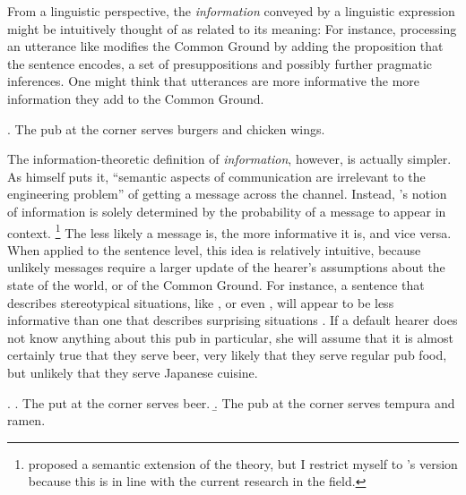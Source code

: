 From a linguistic perspective, the \textit{information} conveyed by a linguistic expression might be intuitively thought of as related to its meaning: For instance, processing an utterance like \Next modifies the Common Ground \citep{stalnaker2002} by adding the proposition that the sentence encodes, a set of presuppositions and possibly further pragmatic inferences. One might think that utterances are more informative the more information they add to the Common Ground.

\ex. The pub at the corner serves burgers and chicken wings.

The information-theoretic definition of \textit{information}, however, is actually simpler. As \citet[379]{shannon1948} himself puts it, ``semantic aspects of communication are irrelevant to the engineering problem'' of getting a message across the channel. Instead, \citeauthor{shannon1948}'s notion of information is solely determined by the probability of a message to appear in context.%
%
\footnote{\citet{bar-hillel.carnap1953} proposed a semantic extension of the theory, but I restrict myself to \citeauthor{shannon1948}'s version because this is in line with the current research in the field.}\afterfn%
%
The less likely a message is, the more informative it is, and vice versa. When applied to the sentence level, this idea is relatively intuitive, because unlikely messages require a larger update of the hearer's assumptions about the state of the world, or of the Common Ground. For instance, a sentence that describes stereotypical situations, like \Last, or even \Next[a], will appear to be less informative than one that describes surprising situations \Next[b]. If a default hearer does not know anything about this pub in particular, she will assume that it is almost certainly true that they serve beer, very likely that they serve regular pub food, but unlikely that they serve Japanese cuisine.

\ex. \a. The put at the corner serves beer.
     \b. The pub at the corner serves tempura and ramen.

